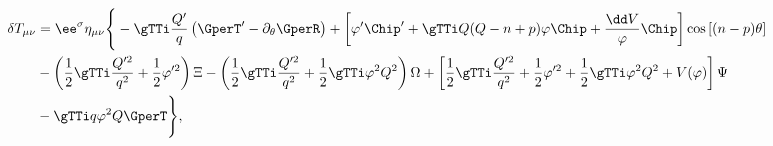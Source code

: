 \begin{equation}
\begin{aligned}
\delta T_{\mu \nu} & = \ee^{\sigma} \eta_{\mu \nu} \Bigg\{-\gTTi
\frac{Q'}{q} \left(\GperT' - \partial_\theta \GperR \right) +
\left[\varphi' \Chip' + \gTTi Q (Q-n+p) \varphi \Chip + {\dd V \over
\varphi} \Chip \right] \cos\left[(n-p)\theta\right] \\ & -
\left(\frac{1}{2} \gTTi \frac{Q'^2}{q^2} + \frac{1}{2} \varphi'^2
\right) \Xi - \left(\frac{1}{2} \gTTi \frac{Q'^2}{q^2} + \frac{1}{2}
\gTTi \varphi^2 Q^2 \right) \Omega + \left[\frac{1}{2} \gTTi
\frac{Q'^2}{q^2} + \frac{1}{2} \varphi'^2 + \frac{1}{2} \gTTi
\varphi^2 Q^2 + V(\varphi) \right] \Psi \\ & - \gTTi q \varphi^2 Q
\GperT \Bigg\},
\end{aligned}
\end{equation}

